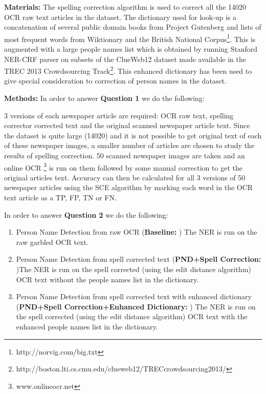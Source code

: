\documentclass[letterpaper,11pt]{report}
\begin{document}
\noindent \textbf{Materials: }
The spelling correction algorithm is used to correct all the 14020 OCR raw text articles in the dataset. The dictionary used for look-up is a concatenation of several public domain books from Project Gutenberg and lists of most frequent words from Wiktionary and the British National Corpus\footnote{http://norvig.com/big.txt}. This is augmented with a large people names list which is obtained  by running Stanford NER-CRF parser on subsets of the ClueWeb12 dataset made available in the TREC 2013 Crowdsourcing Track\footnote{http://boston.lti.cs.cmu.edu/clueweb12/TRECcrowdsourcing2013/}. This enhanced dictionary has been used to give special consideration to correction of person names in the dataset.

\noindent \textbf{Methods: }
In order to answer \textbf{Question 1} we do the following: 

3 versions of each newspaper article are required: OCR raw text, spelling corrector corrected text and the original scanned newspaper article text. Since the dataset is quite large (14020) and it is not possible to get original text of each of these newspaper images, a smaller number of articles are chosen to study the results of spelling correction. 50 scanned newspaper images are taken and an online OCR \footnote{www.onlineocr.net} is run on them followed by some manual correction to get the original articles text. Accuracy can then be calculated for all 3 versions of 50 newspaper articles using the SCE algorithm by marking each word in the OCR text article as a TP, FP, TN or FN. 

In order to answer \textbf{Question 2} we do the following: 
\begin{enumerate}
\item Person Name Detection from raw OCR (\textbf{Baseline: }) The NER is run on the raw garbled OCR text.
\item Person Name Detection from spell corrected text (\textbf{PND+Spell Correction: })The NER is run on the spell corrected (using the edit distance algorithm) OCR text without the people names list in the dictionary.
\item Person Name Detection from spell corrected text with enhanced dictionary (\textbf{PND+Spell Correction+Enhanced Dictionary: }) The NER is run on the spell corrected (using the edit distance algorithm) OCR text with the enhanced people names list in the dictionary.

\end{enumerate}
\end{document}
